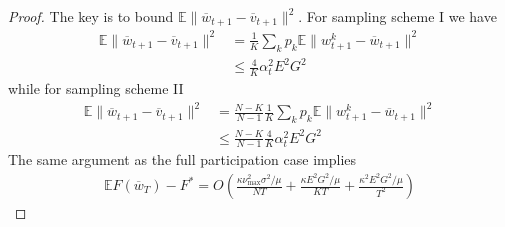 \begin{proof}
	The key is to bound $\mathbb{E}\|\overline{w}_{t+1}-\overline{v}_{t+1}\|^{2}$.
	For sampling scheme I we have 
	\begin{align*}
	\mathbb{E}\|\overline{w}_{t+1}-\overline{v}_{t+1}\|^{2} & =\frac{1}{K}\sum_{k}p_{k}\mathbb{E}\|w_{t+1}^{k}-\overline{w}_{t+1}\|^{2}\\
	& \leq\frac{4}{K}\alpha_{t}^{2}E^{2}G^{2}
	\end{align*}
	while for sampling scheme II 
	\begin{align*}
	\mathbb{E}\|\overline{w}_{t+1}-\overline{v}_{t+1}\|^{2} & =\frac{N-K}{N-1}\frac{1}{K}\sum_{k}p_{k}\mathbb{E}\|w_{t+1}^{k}-\overline{w}_{t+1}\|^{2}\\
	& \leq\frac{N-K}{N-1}\frac{4}{K}\alpha_{t}^{2}E^{2}G^{2}
	\end{align*}
	The same argument as the full participation case implies 
	\begin{align*}
	\mathbb{E}F(\overline{w}_{T})-F^{\ast}=O(\frac{\kappa\nu_{\max}^{2}\sigma^{2}/\mu}{NT}+\frac{\kappa E^{2}G^{2}/\mu}{KT}+\frac{\kappa^{2}E^{2}G^{2}/\mu}{T^{2}})
	\end{align*}
	
	\begin{comment}
	\begin{proof}
	With partial participation, $2E\sum_{\tau=1}^{E-1}\alpha_{t-\tau}^{2}\sum_{k=1}^{N}p_{k}\left(\|\nabla F_{k}(\overline{w}_{t-\tau},\xi_{t-\tau}^{k})\|^{2}+l^{2}\|w_{t-\tau}^{k}-\overline{w}_{t-\tau}\|^{2}\right)$
	\begin{align*}
	\mathbb{E}\|\overline{w}_{t+1}-w^{\ast}\|^{2} & \leq\mathbb{E}(1-\mu\alpha_{t})\|\overline{w}_{t}-w^{\ast}\|^{2}+5E^{2}L\alpha_{t}^{3}G^{2}+\alpha_{t}^{2}\frac{1}{N}\nu_{max}^{2}\sigma^{2}+\frac{1}{K}\sum_{k}p^{k}\|w_{t}^{k}-\overline{w}_{t}\|^{2}\\
	& \leq\mathbb{E}(1-\mu\alpha_{t})\|\overline{w}_{t}-w^{\ast}\|^{2}+5E^{2}L\alpha_{t}^{3}G^{2}+\alpha_{t}^{2}\frac{1}{N}\nu_{max}^{2}\sigma^{2}+\frac{4}{K}\alpha_{t}^{2}E^{2}G^{2}\\
	& \leq\mathbb{E}(1-\mu\alpha_{t})(1-\mu\alpha_{t-1})\cdots(1-\mu\alpha_{t-E})\|\overline{w}_{t-E}-w^{\ast}\|^{2}=O(\frac{1}{t-E}\sigma^{2}+E^{2}LG^{2}\frac{1}{(t-E)^{2}}+\frac{E^{2}G^{2}}{K}\frac{1}{(t-E)^{3/2}})\\
	& +(\alpha_{t}^{3}+(1-\mu\alpha_{t-1})\alpha_{t-1}^{3}+(1-\mu\alpha_{t-1})(1-\mu\alpha_{t-2})\alpha_{t-2}^{3}+\cdots+(1-\mu\alpha_{t-1})\cdots(1-\mu\alpha_{t-E})\alpha_{t-E}^{3}E^{2}LG^{2}\\
	& +(\alpha_{t}^{2}+(1-\mu\alpha_{t-1})\alpha_{t-1}^{2}+(1-\mu\alpha_{t-1})(1-\mu\alpha_{t-2})\alpha_{t-2}^{2}+\cdots+(1-\mu\alpha_{t-1})\cdots(1-\mu\alpha_{t-E})\alpha_{t-E}^{2}\sigma^{2}\\
	& +\frac{4}{K}EG^{2}(\alpha_{t}^{2}+\alpha_{t-1}^{2}+\cdots+\alpha_{t-E}^{2})
	\end{align*}
	

\end{comment}
\end{proof}
